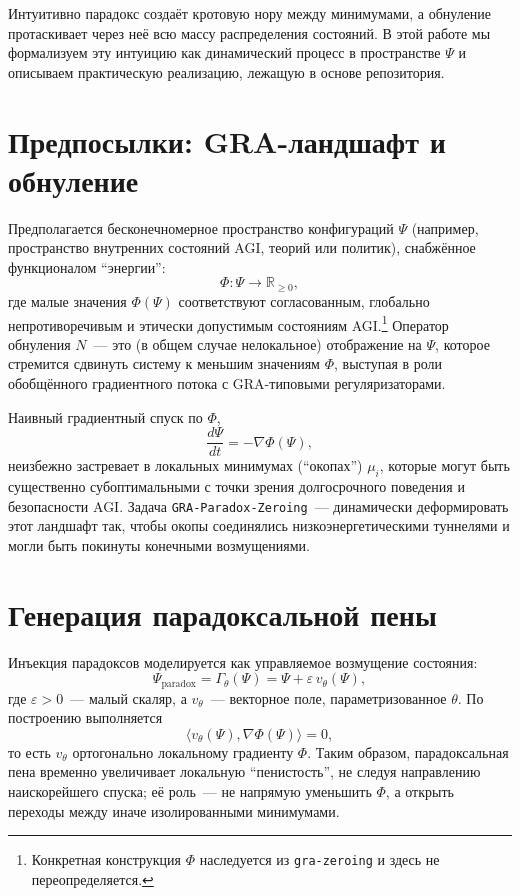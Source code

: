 \documentclass[11pt]{article}
\begin{document}
Интуитивно парадокс создаёт кротовую нору между минимумами, а обнуление протаскивает через неё всю массу распределения состояний. 
В этой работе мы формализуем эту интуицию как динамический процесс в пространстве $\Psi$ и описываем практическую реализацию, лежащую в основе репозитория.

\section{Предпосылки: GRA-ландшафт и обнуление}

Предполагается бесконечномерное пространство конфигураций $\Psi$ (например, пространство внутренних состояний AGI, теорий или политик), снабжённое функционалом ``энергии'':
\begin{equation}
    \Phi : \Psi \to \mathbb{R}_{\ge 0},
\end{equation}
где малые значения $\Phi(\Psi)$ соответствуют согласованным, глобально непротиворечивым и этически допустимым состояниям AGI.\footnote{Конкретная конструкция $\Phi$ наследуется из \texttt{gra-zeroing} и здесь не переопределяется.} 
Оператор обнуления $N$~--- это (в общем случае нелокальное) отображение на $\Psi$, которое стремится сдвинуть систему к меньшим значениям $\Phi$, выступая в роли обобщённого градиентного потока с GRA-типовыми регуляризаторами.

Наивный градиентный спуск по $\Phi$,
\begin{equation}
    \frac{d\Psi}{dt} = - \nabla \Phi(\Psi),
\end{equation}
неизбежно застревает в локальных минимумах (``окопах'') $\mu_i$, которые могут быть существенно субоптимальными с точки зрения долгосрочного поведения и безопасности AGI. 
Задача \texttt{GRA-Paradox-Zeroing}~--- динамически деформировать этот ландшафт так, чтобы окопы соединялись низкоэнергетическими туннелями и могли быть покинуты конечными возмущениями.

\section{Генерация парадоксальной пены}

Инъекция парадоксов моделируется как управляемое возмущение состояния:
\begin{equation}
    \Psi_{\text{paradox}} = \Gamma_{\theta}(\Psi) 
    = \Psi + \varepsilon \, v_{\theta}(\Psi),
\end{equation}
где $\varepsilon > 0$~--- малый скаляр, а $v_{\theta}$~--- векторное поле, параметризованное $\theta$. 
По построению выполняется
\begin{equation}
    \langle v_{\theta}(\Psi), \nabla \Phi(\Psi) \rangle = 0,
\end{equation}
то есть $v_{\theta}$ ортогонально локальному градиенту $\Phi$. 
Таким образом, парадоксальная пена временно увеличивает локальную ``пенистость'', не следуя направлению наискорейшего спуска; её роль~--- не напрямую уменьшить $\Phi$, а открыть переходы между иначе изолированными минимумами.
\end{document}

